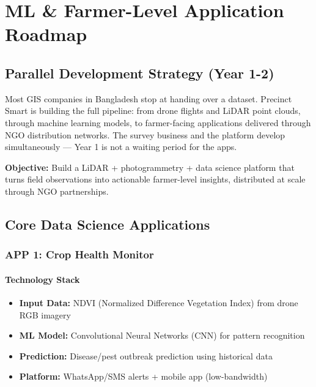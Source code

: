 
\chapter{ML \& Farmer-Level Application Roadmap}

\section{Parallel Development Strategy (Year 1-2)}

Most GIS companies in Bangladesh stop at handing over a dataset. Precinct Smart is building the full pipeline: from drone flights and LiDAR point clouds, through machine learning models, to farmer-facing applications delivered through NGO distribution networks. The survey business and the platform develop simultaneously --- Year 1 is not a waiting period for the apps.

\textbf{Objective:} Build a LiDAR + photogrammetry + data science platform that turns field observations into actionable farmer-level insights, distributed at scale through NGO partnerships.

\section{Core Data Science Applications}

\subsection{APP 1: Crop Health Monitor}

\subsubsection{Technology Stack}

\begin{itemize}
    \item \textbf{Input Data:} NDVI (Normalized Difference Vegetation Index) from drone RGB imagery
    \item \textbf{ML Model:} Convolutional Neural Networks (CNN) for pattern recognition
    \item \textbf{Prediction:} Disease/pest outbreak prediction using historical data
    \item \textbf{Platform:} WhatsApp/SMS alerts + mobile app (low-bandwidth)
\end{itemize}

